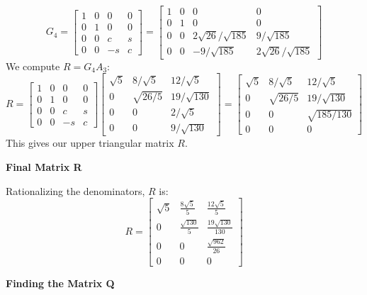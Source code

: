 \documentclass{article}
\newcommand{\0}{{\mathbf{0}}} %
\begin{document}
$$ G_4 =
\begin{bmatrix} 1 & 0 & 0 & 0 \\ 0 & 1 & 0 & 0 \\ 0 & 0 & c & s \\ 0 & 0 & -s & c
\end{bmatrix} =
\begin{bmatrix} 1 & 0 & 0 & 0 \\ 0 & 1 & 0 & 0 \\ 0 & 0 & 2\sqrt{26}/\sqrt{185} & 9/\sqrt{185} \\ 0 & 0 & -9/\sqrt{185} & 2\sqrt{26}/\sqrt{185}
\end{bmatrix} $$
We compute $R = G_4 A_3$:
$$ R =
\begin{bmatrix} 1 & 0 & 0 & 0 \\ 0 & 1 & 0 & 0 \\ 0 & 0 & c & s \\ 0 & 0 & -s & c
\end{bmatrix}
\begin{bmatrix} \sqrt{5} & 8/\sqrt{5} & 12/\sqrt{5} \\ 0 & \sqrt{26/5} & 19/\sqrt{130} \\ 0 & 0 & 2/\sqrt{5} \\ 0 & 0 & 9/\sqrt{130}
\end{bmatrix} =
\begin{bmatrix} \sqrt{5} & 8/\sqrt{5} & 12/\sqrt{5} \\ 0 & \sqrt{26/5} & 19/\sqrt{130} \\ 0 & 0 & \sqrt{185/130} \\ 0 & 0 & 0
\end{bmatrix} $$
This gives our upper triangular matrix $R$.

\textbf{Final Matrix R}

Rationalizing the denominators, $R$ is:
$$ R =
\begin{bmatrix}
\sqrt{5} & \frac{8\sqrt{5}}{5} & \frac{12\sqrt{5}}{5} \\
0 & \frac{\sqrt{130}}{5} & \frac{19\sqrt{130}}{130} \\
0 & 0 & \frac{\sqrt{962}}{26} \\
0 & 0 & 0
\end{bmatrix} $$

\textbf{Finding the Matrix Q}
\end{document}
